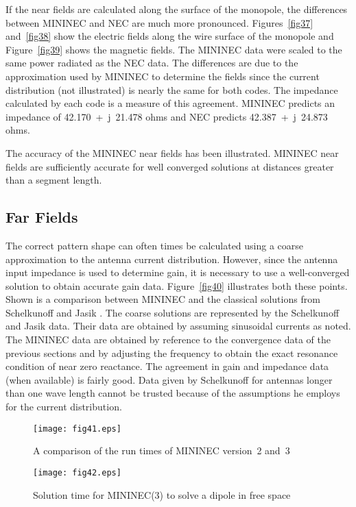 \documentclass[12pt]{article}
\begin{document}
If the near fields are calculated along the surface of the monopole, the
differences between MININEC and NEC are much more pronounced.
Figures~\ref{fig37} and~\ref{fig38} show the electric fields along the
wire surface of the monopole and Figure~\ref{fig39} shows the magnetic
fields. The MININEC data were scaled to the same power radiated as the
NEC data. The differences are due to the approximation used by MININEC
to determine the fields since the current distribution (not illustrated)
is nearly the same for both codes. The impedance calculated by each code
is a measure of this agreement. MININEC predicts an impedance of
42.170~+~j~21.478 ohms and NEC predicts 42.387~+~j~24.873 ohms.

The accuracy of the MININEC near fields has been illustrated. MININEC
near fields are sufficiently accurate for well converged solutions at
distances greater than a segment length.

\subsection{Far Fields}
The correct pattern shape can often times be calculated using a coarse
approximation to the antenna current distribution. However, since the
antenna input impedance is used to determine gain, it is necessary to
use a well-converged solution to obtain accurate gain data.
Figure~\ref{fig40} illustrates both these points. Shown is a comparison
between MININEC and the classical solutions from Schelkunoff
\cite{r22} and Jasik \cite{r23}. The coarse
solutions are represented by the Schelkunoff and Jasik data. Their data
are obtained by assuming sinusoidal currents as noted. The MININEC data
are obtained by reference to the convergence data of the previous
sections and by adjusting the frequency to obtain the exact resonance
condition of near zero reactance. The agreement in gain and impedance
data (when available) is fairly good. Data given by Schelkunoff for
antennas longer than one wave length cannot be trusted because of the
assumptions he employs for the current distribution.

\begin{sidewaysfigure}[htb]
\centerline{\texttt{[image: fig41.eps]}}
\caption{A comparison of the run times of MININEC version~2 and~3}
\label{fig41}
\end{sidewaysfigure}

\begin{sidewaysfigure}[htb]
\centerline{\texttt{[image: fig42.eps]}}
\caption{Solution time for MININEC(3) to solve a dipole in free space}
\label{fig42}
\end{sidewaysfigure}
\end{document}
